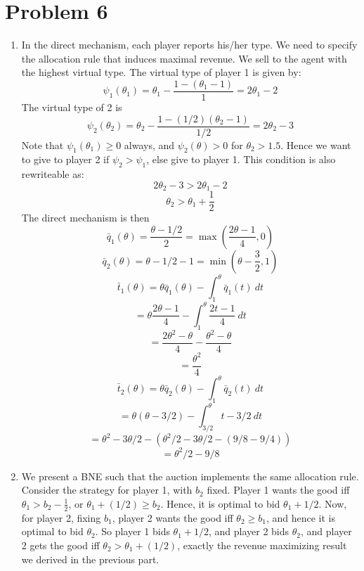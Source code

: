 \documentclass[10pt,letter]{article}
\begin{document}
\section*{Problem 6}
\begin{enumerate}[label=(\alph*)]
\item In the direct mechanism, each player reports his/her type. We need to specify the allocation rule that induces maximal revenue. We sell to the agent with the highest virtual type. The virtual type of player 1 is given by:
\[ \psi_1(\theta_1) = \theta_1 - \frac{1 - (\theta_1 - 1)}{1} = 2\theta_1 - 2 \]
The virtual type of 2 is
\[ \psi_2(\theta_2) = \theta_2 - \frac{1 - (1/2)(\theta_2 - 1)}{1/2} = 2\theta_2 - 3 \]
Note that $\psi_1(\theta_1) \ge 0$ always, and $\psi_2(\theta) > 0$ for $\theta_2 > 1.5$. Hence we want to give to player 2 if $\psi_2 > \psi_1$, else give to player 1. This condition is also rewriteable as:
\[ 2\theta_2 - 3 > 2\theta_1 - 2 \]
\[ \theta_2 > \theta_1 + \frac{1}{2}\]
The direct mechanism is then
\[ \bar{q}_1(\theta) = \frac{\theta - 1/2}{2} = \max\left(\frac{2\theta - 1}{4}, 0\right) \]
\[ \bar{q}_2(\theta) = \theta - 1/2 - 1 = \min\left(\theta - \frac{3}{2}, 1\right) \]
\[ \bar{t}_1(\theta) = \theta  \bar{q}_1(\theta) - \int_1^\theta \bar{q}_1(t) \ dt \]
\[  = \theta  \frac{2\theta - 1}{4} - \int_1^\theta \frac{2t - 1}{4} \ dt  \]
\[ =  \frac{2\theta^2 - \theta}{4} - \frac{\theta^2 - \theta}{4}  \]
\[ =  \frac{\theta^2}{4}   \]
\[ \bar{t}_2(\theta) = \theta \bar{q}_2(\theta) - \int_1^\theta \bar{q}_2(t) \ dt  \]
\[ = \theta (\theta - 3/2) - \int_{3/2}^\theta t - 3/2 \ dt \]
\[ = \theta^2 - 3\theta / 2 - (\theta^2 / 2 - 3\theta/2 - (9/8 - 9/4)) \]
\[ = \theta^2/ 2  - 9/8 \]
\item We present a BNE such that the auction implements the same allocation rule. Consider the strategy for player 1, with $b_2$ fixed. Player 1 wants the good iff $\theta_1 > b_2 - \frac{1}{2}$, or $\theta_1+ (1/2) \ge b_2$. Hence, it is optimal to bid $\theta_1 + 1/2$. Now, for player 2, fixing $b_1$, player 2 wants the good iff $\theta_2 \ge b_1$, and hence it is optimal to bid $\theta_2$. So player 1 bids $\theta_1 + 1/2$, and player 2 bids $\theta_2$, and player 2 gets the good iff $\theta_2 > \theta_1 + (1/2)$, exactly the revenue maximizing result we derived in the previous part.
\end{enumerate}
\end{document}
